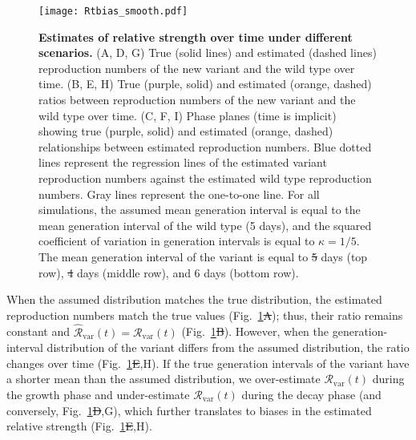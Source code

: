 \documentclass[12pt]{article}
\newcommand{\fref}[1]{Fig.~\ref{fig:#1}}
\newcommand{\vvvar}{\mathrm{var}}
\newcommand{\Rx}[1]{\ensuremath{{\mathcal R}_{#1}}\xspace}
\newcommand{\RR}{\ensuremath{{\mathcal R}}\xspace}
\newcommand{\Rv}{\Rx{\vvvar}}
\providecommand{\DIFaddtex}[1]{{\protect\color{blue}\uwave{#1}}} %
\providecommand{\DIFdeltex}[1]{{\protect\color{red}\sout{#1}}}                      %
\providecommand{\DIFaddbegin}{} %
\providecommand{\DIFaddend}{} %
\providecommand{\DIFdelbegin}{} %
\providecommand{\DIFdelend}{} %
\providecommand{\DIFaddFL}[1]{\DIFadd{#1}} %
\providecommand{\DIFdelFL}[1]{\DIFdel{#1}} %
\providecommand{\DIFaddbeginFL}{} %
\providecommand{\DIFaddendFL}{} %
\providecommand{\DIFdelbeginFL}{} %
\providecommand{\DIFdelendFL}{} %
\providecommand{\DIFadd}[1]{\texorpdfstring{\DIFaddtex{#1}}{#1}} %
\providecommand{\DIFdel}[1]{\texorpdfstring{\DIFdeltex{#1}}{}} %
\newcommand{\DIFscaledelfig}{0.5}
\newlength{\DIFdelgraphicswidth} %
\newlength{\DIFdelgraphicsheight} %
\newcommand{\DIFaddincludegraphics}[2][]{{\color{blue}\fbox{\DIFOincludegraphics[#1]{#2}}}} %
\newcommand{\DIFdelincludegraphics}[2][]{%
\sbox{\DIFdelgraphicsbox}{\DIFOincludegraphics[#1]{#2}}%
\settoboxwidth{\DIFdelgraphicswidth}{\DIFdelgraphicsbox} %
\settoboxtotalheight{\DIFdelgraphicsheight}{\DIFdelgraphicsbox} %
\scalebox{\DIFscaledelfig}{%
\parbox[b]{\DIFdelgraphicswidth}{\usebox{\DIFdelgraphicsbox}\\[-\baselineskip] \rule{\DIFdelgraphicswidth}{0em}}\llap{\resizebox{\DIFdelgraphicswidth}{\DIFdelgraphicsheight}{%
\setlength{\unitlength}{\DIFdelgraphicswidth}%
\begin{picture}(1,1)%
\thicklines\linethickness{2pt} %
{\color[rgb]{1,0,0}\put(0,0){\framebox(1,1){}}}%
{\color[rgb]{1,0,0}\put(0,0){\line( 1,1){1}}}%
{\color[rgb]{1,0,0}\put(0,1){\line(1,-1){1}}}%
\end{picture}%
}\hspace*{3pt}}} %
} %
\DeclareRobustCommand{\DIFaddbegin}{\DIFOaddbegin \let\includegraphics\DIFaddincludegraphics} %
\DeclareRobustCommand{\DIFaddend}{\DIFOaddend \let\includegraphics\DIFOincludegraphics} %
\DeclareRobustCommand{\DIFdelbegin}{\DIFOdelbegin \let\includegraphics\DIFdelincludegraphics} %
\DeclareRobustCommand{\DIFdelend}{\DIFOaddend \let\includegraphics\DIFOincludegraphics} %
\DeclareRobustCommand{\DIFaddbeginFL}{\DIFOaddbeginFL \let\includegraphics\DIFaddincludegraphics} %
\DeclareRobustCommand{\DIFaddendFL}{\DIFOaddendFL \let\includegraphics\DIFOincludegraphics} %
\DeclareRobustCommand{\DIFdelbeginFL}{\DIFOdelbeginFL \let\includegraphics\DIFdelincludegraphics} %
\DeclareRobustCommand{\DIFdelendFL}{\DIFOaddendFL \let\includegraphics\DIFOincludegraphics} %
\begin{document}
\begin{figure}[!pht]
\begin{center}
\texttt{[image: Rtbias\_smooth.pdf]}
\caption{
\textbf{Estimates of relative strength over time under different scenarios.}
(A, D, G) True (solid lines) and estimated (dashed lines) reproduction numbers of the new variant and the wild type over time.
(B, E, H) True (purple, solid) and estimated (orange, dashed) ratios between reproduction numbers of the new variant and the wild type over time.
(C, F, I) Phase planes (time is implicit) showing true (purple, solid) and estimated (orange, dashed) relationships between estimated reproduction numbers.
Blue dotted lines represent the regression lines of the estimated variant reproduction numbers against the estimated wild type reproduction numbers.
Gray lines represent the one-to-one line.
For all simulations, the assumed mean generation interval is equal to the mean generation interval of the wild type (5 days), and the squared coefficient of variation in generation intervals is equal to $\kappa = 1/5$.
The mean generation interval of the variant is equal to \DIFdelbeginFL \DIFdelFL{5 }\DIFdelendFL \DIFaddbeginFL \DIFaddFL{4 }\DIFaddendFL days (top row), \DIFdelbeginFL \DIFdelFL{4 }\DIFdelendFL \DIFaddbeginFL \DIFaddFL{5 }\DIFaddendFL days (middle row), and 6 days (bottom row).
}
\DIFdelbeginFL %
\DIFdelendFL \label{fig:Rtbias}
\DIFaddbeginFL \end{center}
\DIFaddendFL \end{figure}

When the assumed distribution matches the true distribution, the estimated reproduction numbers match the true values (\fref{Rtbias}\DIFdelbegin \DIFdel{A}\DIFdelend \DIFaddbegin \DIFadd{D}\DIFaddend ); thus, their ratio remains constant and $\hat{\RR}_{\textrm{var}}(t)=\Rv(t)$ (\fref{Rtbias}\DIFdelbegin \DIFdel{B}\DIFdelend \DIFaddbegin \DIFadd{E}\DIFaddend ).
However, when the generation-interval distribution of the variant differs from the assumed distribution, the ratio changes over time (\fref{Rtbias}\DIFdelbegin \DIFdel{E}\DIFdelend \DIFaddbegin \DIFadd{B}\DIFaddend ,H).
If the true generation intervals of the variant have a shorter mean than the assumed distribution, we over-estimate $\Rv(t)$ during the growth phase and under-estimate $\Rv(t)$ during the decay phase (and conversely, \fref{Rtbias}\DIFdelbegin \DIFdel{D}\DIFdelend \DIFaddbegin \DIFadd{A}\DIFaddend ,G), which further translates to biases in the estimated relative strength (\fref{Rtbias}\DIFdelbegin \DIFdel{E}\DIFdelend \DIFaddbegin \DIFadd{B}\DIFaddend ,H).
\end{document}
